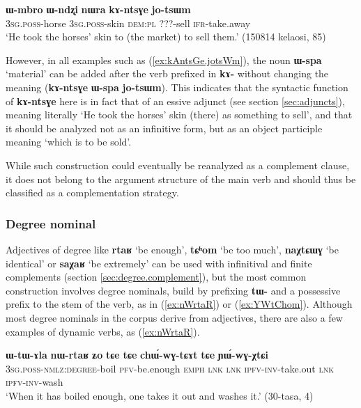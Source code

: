 \documentclass[oneside,a4paper,11pt]{article}
\newcommand{\ipa}[1]{\textbf{\phon#1}} %
\newcommand{\jpg}[2]{\ipa{#1} `#2'} %
\begin{document}
\begin{exe}
\ex \label{ex:kAntsGe.jotsWm}
\gll \ipa{ɯ-mbro} 	\ipa{ɯ-ndʐi} 	\ipa{nɯra} 	\ipa{kɤ-ntsɣe} 	\ipa{jo-tsɯm} \\
\textsc{3sg.poss}-horse \textsc{3sg.poss}-skin \textsc{dem:pl} ???-sell \textsc{ifr}-take.away \\
\glt `He took the horses' skin to (the market) to sell them.' (150814 kelaosi, 85)
\end{exe}

However, in all examples such as (\ref{ex:kAntsGe.jotsWm}), the noun \jpg{ɯ-spa}{material} can be added after the verb prefixed in \ipa{kɤ-} without changing the meaning (\ipa{kɤ-ntsɣe} \ipa{ɯ-spa} \ipa{jo-tsɯm}). This indicates that the syntactic function of \ipa{kɤ-ntsɣe} here is in fact that of an essive adjunct (see section \ref{sec:adjuncts}), meaning literally `He took the horses' skin (there) as something to sell', and that it should be analyzed not as an infinitive form, but as an object participle meaning `which is to be sold'.

While such construction could eventually be reanalyzed as a complement clause, it does not belong to the argument structure of the main verb and should thus be classified as a complementation strategy.


  \subsubsection{Degree nominal}  \label{sec:degree}
Adjectives of degree like \jpg{rtaʁ}{be enough}, \jpg{tɕʰom}{be too much}, \jpg{naχtɕɯɣ}{be identical} or \jpg{saχaʁ}{be extremely} can be used with infinitival and finite complements (section \ref{sec:degree.complement}), but the most common construction involves degree nominals, build by prefixing \ipa{tɯ-} and a possessive prefix to the stem of the verb, as in (\ref{ex:nWrtaR}) or (\ref{ex:YWtChom}). Although most degree nominals in the corpus derive from adjectives, there are also a few examples of dynamic verbs, as (\ref{ex:nWrtaR}).


\begin{exe}
\ex \label{ex:nWrtaR}
\gll \ipa{ɯ-tɯ-ɤla} 	\ipa{nɯ-rtaʁ} 	\ipa{ʑo} 	\ipa{tɕe} 	\ipa{tɕe} 	\ipa{chɯ́-wɣ-tɕɤt} 	\ipa{tɕe} 	\ipa{ɲɯ́-wɣ-χtɕi} \\
\textsc{3sg.poss-nmlz:degree}-boil \textsc{pfv}-be.enough \textsc{emph} \textsc{lnk} \textsc{lnk} \textsc{ipfv-inv}-take.out  \textsc{lnk} \textsc{ipfv-inv}-wash \\
\glt `When it has boiled enough, one takes it out and washes it.' (30-tasa, 4)
\end{exe}
\end{document}
